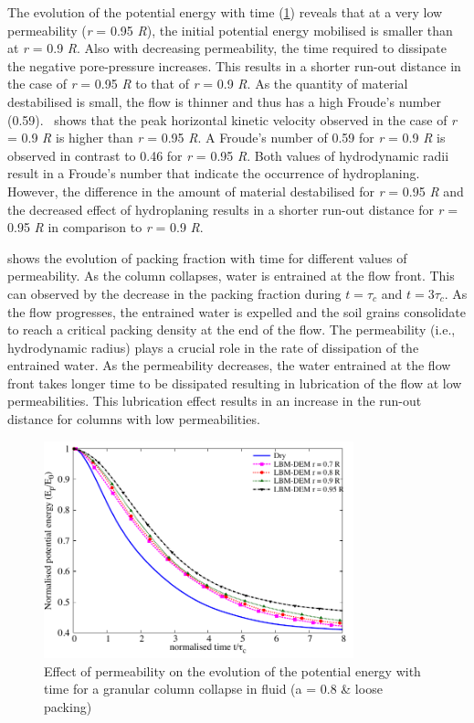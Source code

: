 The evolution of the potential energy with time (\cref{fig:PE_a08_loose}) 
reveals that at a very low permeability (\textit{r} = 0.95 \textit{R}), the 
initial potential energy mobilised is smaller than at \textit{r} = 0.9 
\textit{R}. Also with decreasing permeability, the time required to 
dissipate the negative pore-pressure increases. This results in a shorter 
run-out distance in the case of \textit{r} = 0.95 \textit{R} to that of 
\textit{r} = 0.9 \textit{R}. As the quantity of material destabilised is small, 
the flow is thinner and thus has a high Froude's number 
(0.59).~ shows that the peak horizontal kinetic 
velocity observed in the case of \textit{r} = 0.9 \textit{R} is higher than 
\textit{r} = 0.95 \textit{R}. A Froude's number of 0.59 for \textit{r} = 0.9 
\textit{R} is observed in contrast to 0.46 for \textit{r} = 0.95 \textit{R}. 
Both values of hydrodynamic radii result in a Froude's number that indicate the 
occurrence of hydroplaning. However, the difference in the amount of material 
destabilised for \textit{r} = 0.95 \textit{R} and the decreased effect of 
hydroplaning results in a shorter run-out distance for \textit{r} = 0.95 
\textit{R} in comparison to \textit{r} = 0.9 \textit{R}.


 shows the evolution of packing 
fraction with time for different values of permeability. As the column 
collapses, water is entrained at the flow front. This can 
observed by the decrease in the packing fraction during $t = \tau_c$ and $t = 
3\tau_c$. As the flow progresses, the entrained water is expelled and the soil 
grains consolidate to reach a critical packing density at the end of the flow. 
The permeability (i.e., hydrodynamic radius) plays a crucial role in the rate 
of dissipation of the entrained water. As the permeability decreases, the water 
entrained at the flow 
front takes longer time to be dissipated resulting in lubrication of the flow 
at low permeabilities. This lubrication effect results in an increase in the 
run-out distance for columns with low permeabilities.

\begin{figure}
	\centering
    \includegraphics[width=0.8\textwidth]{PE_a08_loose}
    \caption{Effect of permeability on the evolution of the potential energy 
    with time for a granular column collapse in fluid (a = 0.8 \& loose 
    packing)}
    \label{fig:PE_a08_loose}
\end{figure}


